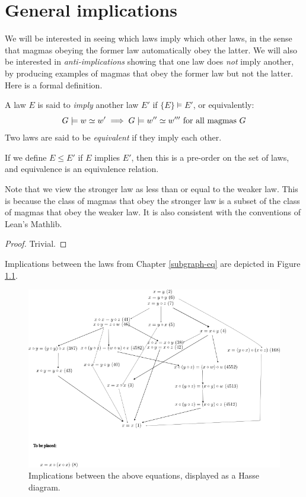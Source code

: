\chapter{General implications}

We will be interested in seeing which laws imply which other laws, in the sense that magmas obeying the former law automatically obey the latter.  We will also be interested in \emph{anti-implications} showing that one law does \emph{not} imply another, by producing examples of magmas that obey the former law but not the latter. Here is a formal definition.

\begin{definition}[Implication]\label{impl}  A law $E$ is said to \emph{imply} another law $E'$ if $\{E\} \models E'$, or equivalently:
  $$ G \models w  \simeq  w' \implies G \models w''  \simeq  w''' \hbox{ for all magmas } G$$
Two laws are said to be \emph{equivalent} if they imply each other.
\end{definition}

\begin{lemma}\leanok\label{pre-order}  If we define $E \leq E'$ if $E$ implies $E'$, then this is a pre-order on the set of laws, and equivalence is an equivalence relation.
\end{lemma}

Note that we view the stronger law as less than or equal to the weaker law.  This is because the class of magmas that obey the stronger law is a subset of the class of magmas that obey the weaker law.  It is also consistent with the conventions of Lean's Mathlib.

\begin{proof}\leanok Trivial.
\end{proof}

Implications between the laws from Chapter \ref{subgraph-eq} are depicted in Figure \ref{fig:implications}.

\begin{figure}
  \centering
  \includegraphics[width=0.5\linewidth]{../../images/implications.png}
  \caption{Implications between the above equations, displayed as a Hasse diagram.}
  \label{fig:implications}
\end{figure}


